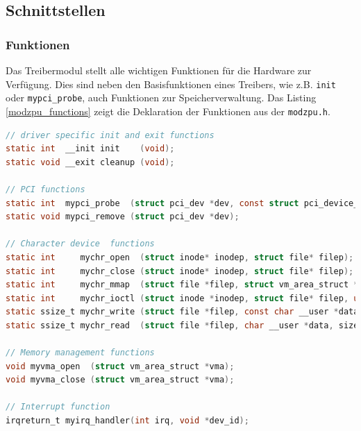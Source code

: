 \documentclass[11pt]{scrartcl}
\begin{document}
\subsection{Schnittstellen}

\subsubsection{Funktionen}

Das Treibermodul stellt alle wichtigen Funktionen für die Hardware zur Verfügung. Dies sind neben den Basisfunktionen eines Treibers, wie z.B. \texttt{init} oder \texttt{mypci\_probe}, auch Funktionen zur Speicherverwaltung. Das Listing \ref{modzpu_functions} zeigt die Deklaration der Funktionen aus der \texttt{modzpu.h}.

\begin{lstlisting}[language=C,firstnumber=47, label=modzpu_functions,caption=Funktionsüberblick des Treibermoduls]
// driver specific init and exit functions
static int  __init init    (void);
static void __exit cleanup (void);

// PCI functions
static int  mypci_probe  (struct pci_dev *dev, const struct pci_device_id *id);
static void mypci_remove (struct pci_dev *dev);

// Character device  functions
static int     mychr_open  (struct inode* inodep, struct file* filep);
static int     mychr_close (struct inode* inodep, struct file* filep);
static int     mychr_mmap  (struct file *filep, struct vm_area_struct *vma);
static int     mychr_ioctl (struct inode *inodep, struct file* filep, unsigned int cmd, unsigned long param);
static ssize_t mychr_write (struct file *filep, const char __user *data, size_t count, loff_t *offset);
static ssize_t mychr_read  (struct file *filep, char __user *data, size_t count, loff_t *offset);

// Memory management functions
void myvma_open  (struct vm_area_struct *vma);
void myvma_close (struct vm_area_struct *vma);

// Interrupt function
irqreturn_t myirq_handler(int irq, void *dev_id);
\end{lstlisting}
\end{document}
